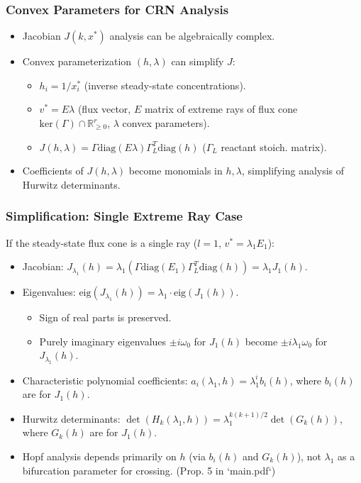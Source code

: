 \documentclass[aspectratio=169]{beamer}
\begin{document}
\begin{frame}{\insertsectionhead}
	\frametitle{Convex Parameters for CRN Analysis}
	\begin{itemize}
		\item Jacobian $J(k, x^*)$ analysis can be algebraically complex.
		\item \alert{Convex parameterization} $(h, \lambda)$ can simplify $J$:
			\begin{itemize}
				\item $h_i = 1/x_i^*$ (inverse steady-state concentrations).
				\item $v^* = E\lambda$ (flux vector, $E$ matrix of extreme rays of flux cone $\text{ker}(\Gamma) \cap \mathbb{R}^r_{\ge 0}$, $\lambda$ convex parameters).
				\item $J(h, \lambda) = \Gamma \text{diag}(E\lambda) \Gamma_L^T \text{diag}(h)$ ($\Gamma_L$ reactant stoich. matrix).
			\end{itemize}
		\item Coefficients of $J(h,\lambda)$ become \alert{monomials} in $h, \lambda$, simplifying analysis of Hurwitz determinants.
	\end{itemize}
\end{frame}

\begin{frame}{\insertsectionhead}
	\frametitle{Simplification: Single Extreme Ray Case}
	If the steady-state flux cone is a single ray ($l=1$, $v^* = \lambda_1 E_1$):
	\begin{itemize}
		\item Jacobian: $J_{\lambda_1}(h) = \lambda_1 (\Gamma \text{diag}(E_1) \Gamma_L^T \text{diag}(h)) = \lambda_1 J_1(h)$.
		\item Eigenvalues: $\text{eig}(J_{\lambda_1}(h)) = \lambda_1 \cdot \text{eig}(J_1(h))$.
			\begin{itemize}
				\item Sign of real parts is preserved.
				\item Purely imaginary eigenvalues $\pm i \omega_0$ for $J_1(h)$ become $\pm i \lambda_1 \omega_0$ for $J_{\lambda_1}(h)$.
			\end{itemize}
		\item Characteristic polynomial coefficients: $a_i(\lambda_1, h) = \lambda_1^i b_i(h)$, where $b_i(h)$ are for $J_1(h)$.
		\item Hurwitz determinants: $\det(H_k(\lambda_1,h)) = \lambda_1^{k(k+1)/2} \det(G_k(h))$, where $G_k(h)$ are for $J_1(h)$.
		\item \alert{Hopf analysis depends primarily on $h$ (via $b_i(h)$ and $G_k(h)$), not $\lambda_1$ as a bifurcation parameter for crossing.} (Prop. 5 in `main.pdf`)
	\end{itemize}
\end{frame}
\end{document}
